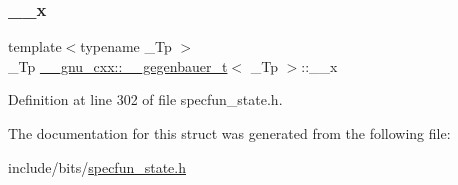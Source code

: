 \subsubsection{\texorpdfstring{\+\_\+\+\_\+x}{\_\_x}}
{\footnotesize\ttfamily template$<$typename \+\_\+\+Tp $>$ \\
\+\_\+\+Tp \hyperlink{struct____gnu__cxx_1_1____gegenbauer__t}{\+\_\+\+\_\+gnu\+\_\+cxx\+::\+\_\+\+\_\+gegenbauer\+\_\+t}$<$ \+\_\+\+Tp $>$\+::\+\_\+\+\_\+x}



Definition at line 302 of file specfun\+\_\+state.\+h.



The documentation for this struct was generated from the following file\+:\begin{DoxyCompactItemize}
\item 
include/bits/\hyperlink{specfun__state_8h}{specfun\+\_\+state.\+h}\end{DoxyCompactItemize}
